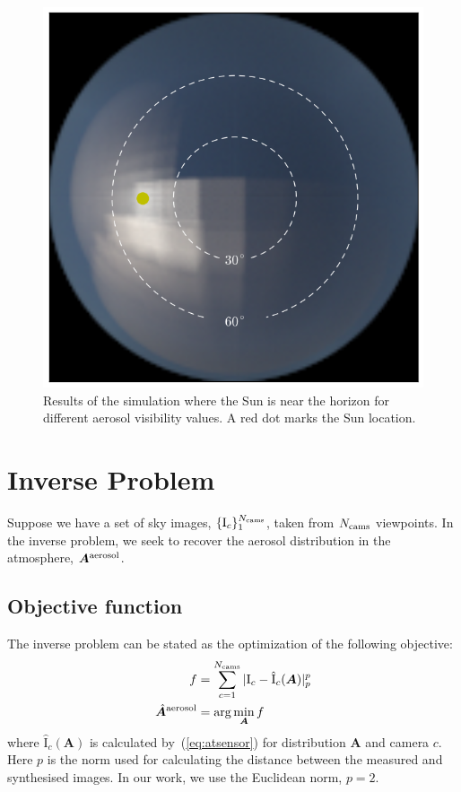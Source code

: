 \documentclass[10pt,twocolumn,letterpaper]{article}
\newcommand{\argmin}{\mathrm{arg}\min}
\newcommand{\mat}[1]{\bm{#1}}
\begin{document}
\begin{figure}
 \includegraphics[width=\columnwidth]{images/ref_img37.png}
  \caption{Results of the simulation where the Sun is near the horizon
    for different aerosol visibility values. A red dot marks the Sun
    location.}
  \label{fig:simulation-results2}
\end{figure}

\section{Inverse Problem}
\label{sec:inverse-problem}

Suppose we have a set of sky images, $\{{\mathrm{I}_c}\}_1^{N_{\rm
    cams}}$, taken from $N_{\rm cams}$ viewpoints.  In the inverse
problem, we seek to recover the aerosol distribution in the
atmosphere, $\mat{A}^{\rm aerosol}$.

\subsection{Objective function}
\label{sec:objective-function}

The inverse problem can be stated as the optimization of the following
objective:
\begin{align}
  \label{eq:objective}
  f &= \sum_{c=1}^{N_{\rm cams}} |\mathrm{I}_c-\hat{\mathrm{I}}_c(\mat{A})|_p^p \\
  \hat{\mat{A}}^{\rm aerosol} &= \argmin_{\mat{A}} f \nonumber
\end{align}
where $\hat{\mathrm{I}}_c(\mat{A})$ is calculated
by~(\ref{eq:atsensor}) for distribution $\mat{A}$ and camera $c$. Here
$p$ is the norm used for calculating the distance between the measured
and synthesised images. In our work, we use the Euclidean norm, $p=2$.
\end{document}

